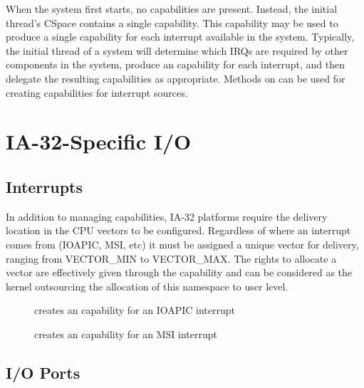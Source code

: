 When the system first starts, no  capabilities are
present. Instead, the initial thread's CSpace contains a single
 capability. This capability may be used to produce
a single  capability for each interrupt available in the
system. Typically, the initial thread of a system will determine which
IRQs are required by other components in the system, produce an
 capability for each interrupt, and then delegate the
resulting capabilities as appropriate. Methods on  can
be used for creating  capabilities for interrupt sources.

\ifxeightsix
\section{IA-32-Specific I/O}

\subsection{Interrupts}
\label{sec:ia32_interrupts}

In addition to managing  capabilities, IA-32 platforms require
the delivery location in the CPU vectors to be configured. Regardless of where
an interrupt comes from (IOAPIC, MSI, etc) it must be assigned a unique vector
for delivery, ranging from VECTOR\_MIN to VECTOR\_MAX. The rights to allocate
a vector are effectively given through the  capability and can
be considered as the kernel outsourcing the allocation of this namespace to
user level.

\begin{description}
    \item[] creates
    an  capability for an IOAPIC interrupt

    \item[] creates
    an  capability for an MSI interrupt
\end{description}

\subsection{I/O Ports}
\label{sec:ioports}

